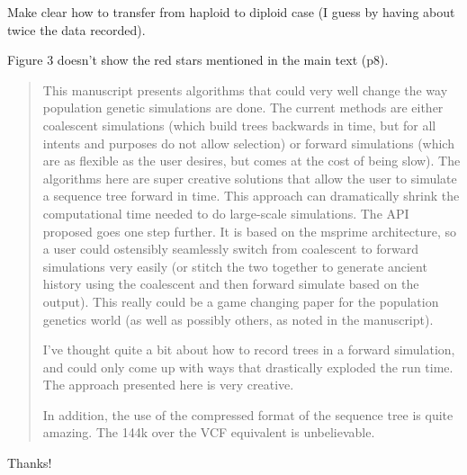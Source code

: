 \begin{point}{}
  Make clear how to transfer from haploid to diploid case (I guess by having
  about twice the data recorded).
\end{point}


\begin{point}{}
  Figure 3 doesn't show the red stars mentioned in the main text (p8).
\end{point}






\begin{quote}
    This manuscript presents algorithms that could very well change the way
    population genetic simulations are done. The current methods are either
    coalescent simulations (which build trees backwards in time, but for all
    intents and purposes do not allow selection) or forward simulations (which are
    as flexible as the user desires, but comes at the cost of being slow). The
    algorithms here are super creative solutions that allow the user to simulate a
    sequence tree forward in time. This approach can dramatically shrink the
    computational time needed to do large-scale simulations. The API proposed goes
    one step further. It is based on the msprime architecture, so a user could
    ostensibly seamlessly switch from coalescent to forward simulations very easily
    (or stitch the two together to generate ancient history using the coalescent
    and then forward simulate based on the output). This really could be a game
    changing paper for the population genetics world (as well as possibly others,
    as noted in the manuscript).

    I've thought quite a bit about how to record trees in a forward simulation, and
    could only come up with ways that drastically exploded the run time. The
    approach presented here is very creative.

    In addition, the use of the compressed format of the sequence tree is quite
    amazing. The 144k over the VCF equivalent is unbelievable.
\end{quote}

Thanks!



